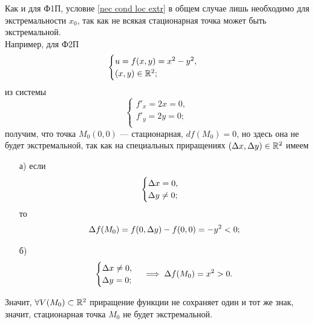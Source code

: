 \documentclass[../../main.tex]{subfiles}
\begin{document}
	\begin{rem}
		Как и для Ф1П, условие \eqref{nec cond loc extr} в общем случае
		лишь необходимо для экстремальности $x_0$, так как не всякая
		стационарная точка может быть экстремальной. \\
		Например, для Ф2П
		\[
		\begin{cases}
			u = f (x, y) = x^2 - y^2, \\
			(x, y) \in \mathbb{R}^2; \\
		\end{cases}
		\]
		из системы
		\[
		\begin{cases}
			f'_x = 2x = 0, \\
			f'_y = 2y = 0; \\
		\end{cases}
		\]
		получим, что точка $M_0 (0, 0)$ --- стационарная,
		$df (M_0) = 0$,
		но здесь она не будет экстремальной, так как на специальных приращениях
		$(\Delta x, \Delta y) \in \mathbb{R}^2$ имеем
		\begin{enumerate}
			\item[а)]
			если
			\[
			\begin{cases}
				\Delta x = 0, \\
				\Delta y \ne 0; \\
			\end{cases}
			\]
			то
			\[
				\Delta f (M_0)
				= f (0, \Delta y) - f (0, 0)
				= -y^2 < 0;
			\]
			
			\item[б)]
			\[
			\begin{cases}
				\Delta x \ne 0, \\
				\Delta y = 0; \\
			\end{cases}
			\implies
			\Delta f (M_0)
			= x^2 > 0.
			\]
		\end{enumerate}
		Значит, $\forall V (M_0) \subset \mathbb{R}^2$ приращение функции
		не сохраняет один и тот же знак, значит, стационарная точка $M_0$
		не будет экстремальной.
	\end{rem}
\end{document}

